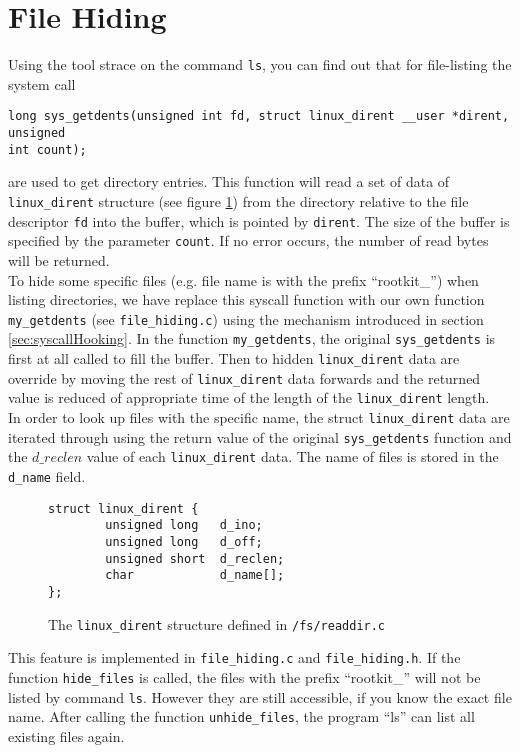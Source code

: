 \section{File Hiding}
Using the tool strace on the command \texttt{ls}, you can find out that for 
file-listing the system call 
\begin{center}
\lstset{escapechar=,style=customc}
\begin{lstlisting}
long sys_getdents(unsigned int fd, struct linux_dirent __user *dirent, unsigned 
int count);
\end{lstlisting}
\end{center}
are used to get directory entries. This function will read a set of data of 
\verb+linux_dirent+ structure (see figure \ref{ls:dirent}) from the directory 
relative to the file descriptor \texttt{fd} into the buffer, which is pointed 
by \texttt{dirent}. The size of the buffer is specified by the parameter 
\texttt{count}. If no error occurs, the number of read bytes will be returned.\\
To hide some specific files (e.g. file name is with the prefix ``rootkit\_'') 
when listing directories, we have replace this syscall function with our own 
function \texttt{my\_getdents} (see \texttt{file\_hiding.c}) using the mechanism 
introduced in section \ref{sec:syscallHooking}. In the function 
\texttt{my\_getdents}, the original \texttt{sys\_getdents} is first at all 
called to fill the buffer. Then to hidden \texttt{linux\_dirent} data are 
override by moving the rest of \texttt{linux\_dirent} data forwards and the 
returned value is reduced of appropriate time of the length of the 
\texttt{linux\_dirent} length.\\ 
In order to look up files with the specific name, the struct 
\texttt{linux\_dirent} data are iterated through using the return value of the 
original \texttt{sys\_getdents} function and the $d\_reclen$ value of each 
\texttt{linux\_dirent} data. The name of files is stored in the \texttt{d\_name} 
field. 
\begin{center}
\begin{figure}[h]
\lstset{escapechar=,style=customc}
\begin{lstlisting}
struct linux_dirent {
        unsigned long   d_ino;
        unsigned long   d_off;
        unsigned short  d_reclen;
        char            d_name[];
};
\end{lstlisting}
\caption{The \texttt{linux\_dirent} structure defined in \texttt{/fs/readdir.c}}
\label{ls:dirent}
\end{figure}
\end{center}
This feature is implemented in \texttt{file\_hiding.c} and \texttt{file\_hiding.h}. If the 
function \texttt{hide\_files} is called, the files with the prefix ``rootkit\_'' will 
not be listed by command \texttt{ls}. However they are still accessible, if you know 
the exact file name. After calling the function \texttt{unhide\_files}, the program 
``ls'' can list all existing files again. 
